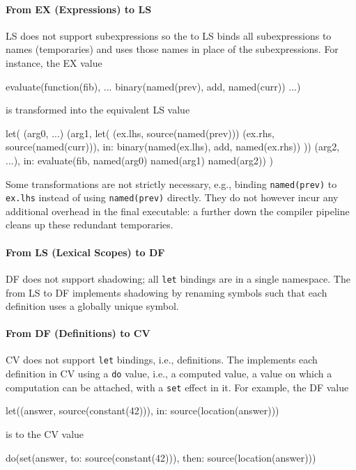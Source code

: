 \documentclass[main.tex]{subfiles}
\begin{document}

\paragraph{From EX (Expressions) to LS} LS does not support subexpressions so the  to LS binds all subexpressions to names (temporaries) and uses those names in place of the subexpressions. For instance, the EX value
\begin{il}
	evaluate(function(fib), ... binary(named(prev), add, named(curr)) ...)
\end{il}
is transformed into the equivalent LS value
\begin{il}
	let(
		(arg0, ...) (arg1, let(
			(ex.lhs, source(named(prev))) (ex.rhs, source(named(curr))),
			in: binary(named(ex.lhs), add, named(ex.rhs))
		)) (arg2, ...),
		in: evaluate(fib, named(arg0) named(arg1) named(arg2))
	)
\end{il}

Some transformations are not strictly necessary, e.g., binding \texttt{named(prev)} to \texttt{ex.lhs} instead of using \texttt{named(prev)} directly. They do not however incur any additional overhead in the final executable: a  further down the compiler pipeline cleans up these redundant temporaries.

\paragraph{From LS (Lexical Scopes) to DF} DF does not support shadowing; all \texttt{let} bindings are in a single namespace. The  from LS to DF implements shadowing by renaming symbols such that each definition uses a globally unique symbol.

\paragraph{From DF (Definitions) to CV} CV does not support \texttt{let} bindings, i.e., definitions. The  implements each definition in CV using a \texttt{do} value, i.e., a computed value, a value on which a computation can be attached, with a \texttt{set} effect in it. For example, the DF value
\begin{il}
	let((answer, source(constant(42))), in: source(location(answer)))
\end{il}
is \lowered{} to the CV value
\begin{il}
	do(set(answer, to: source(constant(42))), then: source(location(answer)))
\end{il}
\end{document}
